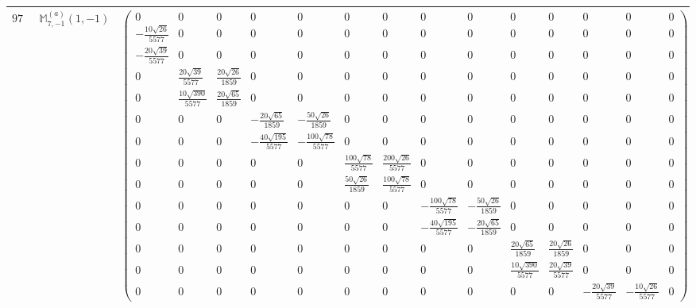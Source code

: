 \documentclass[fleqn,8pt,landscape]{jsarticle}
\begin{document}
\begin{center}
\begin{longtable}{ccc}
$ 970 $ & $ \mathbb{M}_{7,-1}^{(a)}(1,-1) $ & $ \begin{pmatrix} 0 & 0 & 0 & 0 & 0 & 0 & 0 & 0 & 0 & 0 & 0 & 0 & 0 & 0 \\ - \frac{10 \sqrt{26}}{5577} & 0 & 0 & 0 & 0 & 0 & 0 & 0 & 0 & 0 & 0 & 0 & 0 & 0 \\ - \frac{20 \sqrt{39}}{5577} & 0 & 0 & 0 & 0 & 0 & 0 & 0 & 0 & 0 & 0 & 0 & 0 & 0 \\ 0 & \frac{20 \sqrt{39}}{5577} & \frac{20 \sqrt{26}}{1859} & 0 & 0 & 0 & 0 & 0 & 0 & 0 & 0 & 0 & 0 & 0 \\ 0 & \frac{10 \sqrt{390}}{5577} & \frac{20 \sqrt{65}}{1859} & 0 & 0 & 0 & 0 & 0 & 0 & 0 & 0 & 0 & 0 & 0 \\ 0 & 0 & 0 & - \frac{20 \sqrt{65}}{1859} & - \frac{50 \sqrt{26}}{1859} & 0 & 0 & 0 & 0 & 0 & 0 & 0 & 0 & 0 \\ 0 & 0 & 0 & - \frac{40 \sqrt{195}}{5577} & - \frac{100 \sqrt{78}}{5577} & 0 & 0 & 0 & 0 & 0 & 0 & 0 & 0 & 0 \\ 0 & 0 & 0 & 0 & 0 & \frac{100 \sqrt{78}}{5577} & \frac{200 \sqrt{26}}{5577} & 0 & 0 & 0 & 0 & 0 & 0 & 0 \\ 0 & 0 & 0 & 0 & 0 & \frac{50 \sqrt{26}}{1859} & \frac{100 \sqrt{78}}{5577} & 0 & 0 & 0 & 0 & 0 & 0 & 0 \\ 0 & 0 & 0 & 0 & 0 & 0 & 0 & - \frac{100 \sqrt{78}}{5577} & - \frac{50 \sqrt{26}}{1859} & 0 & 0 & 0 & 0 & 0 \\ 0 & 0 & 0 & 0 & 0 & 0 & 0 & - \frac{40 \sqrt{195}}{5577} & - \frac{20 \sqrt{65}}{1859} & 0 & 0 & 0 & 0 & 0 \\ 0 & 0 & 0 & 0 & 0 & 0 & 0 & 0 & 0 & \frac{20 \sqrt{65}}{1859} & \frac{20 \sqrt{26}}{1859} & 0 & 0 & 0 \\ 0 & 0 & 0 & 0 & 0 & 0 & 0 & 0 & 0 & \frac{10 \sqrt{390}}{5577} & \frac{20 \sqrt{39}}{5577} & 0 & 0 & 0 \\ 0 & 0 & 0 & 0 & 0 & 0 & 0 & 0 & 0 & 0 & 0 & - \frac{20 \sqrt{39}}{5577} & - \frac{10 \sqrt{26}}{5577} & 0 \end{pmatrix} $ \\ \hline

\end{longtable}
\end{center}
\end{document}
